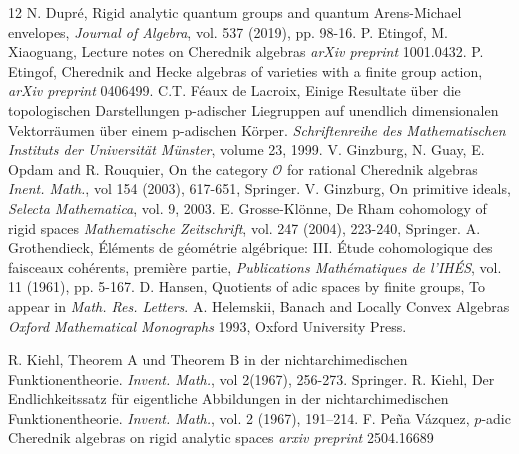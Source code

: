 \documentclass{amsart}
\newcommand{\OX}{\mathcal{O}}
\begin{document}
\begin{thebibliography}{12}
 N. Dupré, Rigid analytic quantum groups and quantum Arens-Michael envelopes, \emph{Journal of Algebra}, vol. 537 (2019), pp. 98-16.
 P. Etingof, M. Xiaoguang, Lecture notes on Cherednik algebras \emph{arXiv preprint} 1001.0432. 
 P. Etingof, Cherednik and Hecke algebras of varieties with a finite group action, \emph{arXiv preprint} 0406499.
 C.T. Féaux de Lacroix, Einige Resultate über die topologischen Darstellungen p-adischer Liegruppen
auf unendlich dimensionalen Vektorräumen über einem p-adischen Körper. \emph{Schriftenreihe des Mathematischen
Instituts der Universität Münster}, volume 23, 1999.
 V. Ginzburg, N. Guay, E. Opdam and R. Rouquier, On the category $\OX$ for rational Cherednik algebras \emph{Inent. Math.}, vol 154 (2003), 617-651, Springer.
 V. Ginzburg, On primitive ideals, \emph{Selecta Mathematica}, vol. 9, 2003.
 E. Grosse-Kl{\"o}nne, De Rham cohomology of rigid spaces
\emph{Mathematische Zeitschrift}, vol. 247 (2004), 223-240, Springer.
 A. Grothendieck, {\'E}l{\'e}ments de g{\'e}om{\'e}trie alg{\'e}brique: III. {\'E}tude cohomologique des faisceaux coh{\'e}rents, premi{\`e}re partie, \emph{Publications Math{\'e}matiques de l'IH{\'E}S}, vol. 11 (1961), pp. 5-167.
 D. Hansen, Quotients of adic spaces by finite groups, To appear in \emph{Math. Res. Letters}.
 A. Helemskii, Banach and Locally Convex Algebras \emph{Oxford Mathematical Monographs} 1993, Oxford University Press.

 R. Kiehl, Theorem A und Theorem B in der nichtarchimedischen Funktionentheorie. \emph{Invent. Math.}, vol 2(1967), 256-273. Springer.
 R. Kiehl, Der Endlichkeitssatz für eigentliche Abbildungen in der nichtarchimedischen Funktionentheorie. \emph{Invent. Math.}, vol. 2 (1967), 191–214.
 F. Peña Vázquez, $p$-adic Cherednik algebras on rigid analytic spaces \emph{arxiv preprint } 2504.16689


\end{thebibliography}
\end{document}
